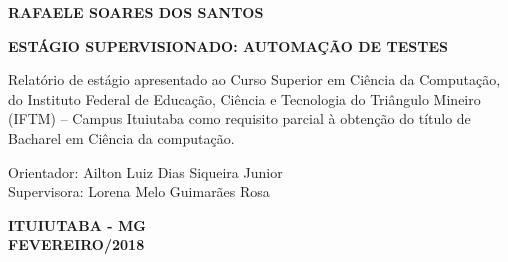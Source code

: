 \newpage
\thispagestyle{empty}

\begin{center}
\textbf{RAFAELE SOARES DOS SANTOS}

\vspace*{7 cm}

\textbf{\large{ESTÁGIO SUPERVISIONADO: AUTOMAÇÃO DE TESTES}}
\end{center}

\vspace*{3 cm}

\hfill
\begin{minipage}{8cm}
\begin{singlespace}
\footnotesize{Relatório de estágio apresentado ao Curso Superior em Ciência da Computação, do Instituto Federal de Educação, Ciência e Tecnologia do Triângulo Mineiro (IFTM) – Campus Ituiutaba como requisito parcial à obtenção do título de Bacharel em Ciência da computação.}
\end{singlespace}

\vspace*{1 cm}

Orientador: Ailton Luiz Dias Siqueira Junior\\
Supervisora: Lorena Melo Guimarães Rosa
\end{minipage}



\vspace*{6 cm}

\begin{center}
\textbf{ITUIUTABA - MG\\
FEVEREIRO/2018}
\end{center}